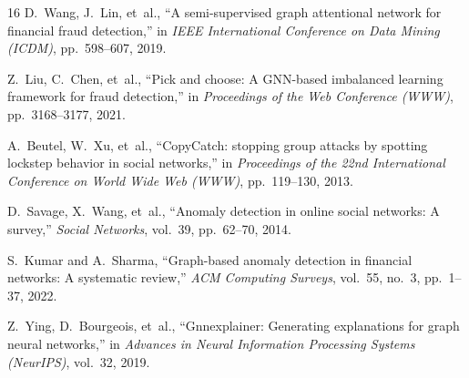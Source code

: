 \documentclass[10pt,twocolumn]{article}
\begin{document}
\begin{thebibliography}{16}
D.~Wang, J.~Lin, et~al., ``A semi-supervised graph attentional network for financial fraud detection,'' in \textit{IEEE International Conference on Data Mining (ICDM)}, pp.~598--607, 2019.

Z.~Liu, C.~Chen, et~al., ``Pick and choose: A GNN-based imbalanced learning framework for fraud detection,'' in \textit{Proceedings of the Web Conference (WWW)}, pp.~3168--3177, 2021.

A.~Beutel, W.~Xu, et~al., ``CopyCatch: stopping group attacks by spotting lockstep behavior in social networks,'' in \textit{Proceedings of the 22nd International Conference on World Wide Web (WWW)}, pp.~119--130, 2013.

D.~Savage, X.~Wang, et~al., ``Anomaly detection in online social networks: A survey,'' \textit{Social Networks}, vol.~39, pp.~62--70, 2014.

S.~Kumar and A.~Sharma, ``Graph-based anomaly detection in financial networks: A systematic review,'' \textit{ACM Computing Surveys}, vol.~55, no.~3, pp.~1--37, 2022.

Z.~Ying, D.~Bourgeois, et~al., ``Gnnexplainer: Generating explanations for graph neural networks,'' in \textit{Advances in Neural Information Processing Systems (NeurIPS)}, vol.~32, 2019.
\end{thebibliography}
\end{document}
